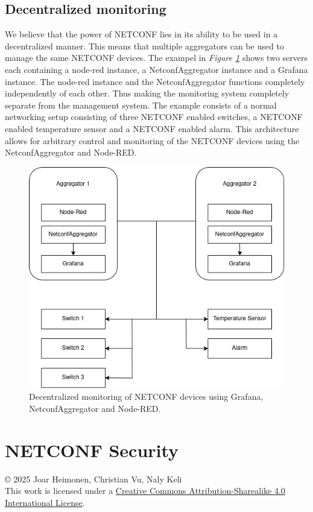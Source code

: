 \documentclass[12pt]{article}
\newcommand{\license}{
    \vspace{1em}
    \noindent\small{© 2025 Joar Heimonen,  Christian Vu, Naly Keli\\
    This work is licensed under a \href{https://creativecommons.org/licenses/by-sa/4.0/}{Creative Commons Attribution-Sharealike 4.0 International License}.}
}
\begin{document}
\newpage

\subsection{Decentralized monitoring}
We believe that the power of NETCONF lies in its ability to be used in a decentralized manner.
This means that multiple aggregators can be used to manage the same NETCONF devices. 
The exampel in \textit{Figure \ref{fig:decentralized-monitoring}} shows two servers each containing a node-red instance, a NetconfAggregator 
instance and a Grafana instance. The node-red instance and the NetconfAggregator functions completely independently of each other.
Thus making the monitoring system completely separate from the management system. The example consists of a normal networking setup
consisting of three NETCONF enabled switches, a NETCONF enabled temperature sensor and a NETCONF enabled alarm.
This architecture allows for arbitrary control and monitoring of the NETCONF devices using the NetconfAggregator and Node-RED.

\newpage

\begin{figure}
  \centering
  \includegraphics[width=\textwidth]{architecture1.png}
  \caption{Decentralized monitoring of NETCONF devices using Grafana, NetconfAggregator and Node-RED.}
  \label{fig:decentralized-monitoring}
\end{figure}

\newpage

\section{NETCONF Security}

\pagebreak
{}
\printbibliography
\license
\end{document}
